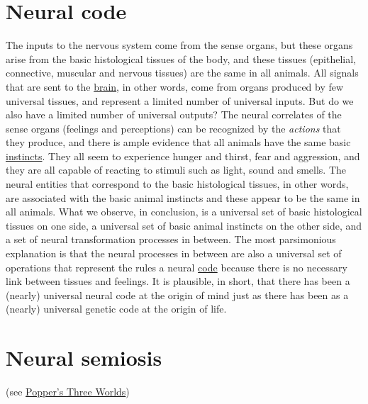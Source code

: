 \documentclass[12pt]{article}
\begin{document}
\section{Neural code}
The inputs to the nervous system come from the sense organs, but these organs arise from the basic histological tissues of the body, and these tissues (epithelial, connective, muscular and nervous tissues) are the same in all animals. All signals that are sent to the \hyperlink{brain}{brain}, in other words, come from organs produced by few universal tissues, and represent a limited number of universal inputs. But do we also have a limited number of universal outputs? The neural correlates of the sense organs (feelings and perceptions) can be recognized by the \textit{actions} that they produce, and there is ample evidence that all animals have the same basic \hyperlink{instinctive_brain}{instincts}. They all seem to experience hunger and thirst, fear and aggression, and they are all capable of reacting to stimuli such as light, sound and smells. The neural entities that correspond to the basic histological tissues, in other words, are associated with the basic animal instincts and these appear to be the same in all animals. What we observe, in conclusion, is a universal set of basic histological tissues on one side, a universal set of basic animal instincts on the other side, and a set of neural transformation processes in between. The most parsimonious explanation is that the neural processes in between are also a universal set of operations that represent the rules a neural \hyperlink{code}{code} because there is no necessary link between tissues and feelings. It is plausible, in short, that there has been a (nearly) universal neural code at the origin of mind just as there has been as a (nearly) universal genetic code at the origin of life. 


\hypertarget{neural_semiosis}{}
\section{Neural semiosis} (see \hyperlink{poppers_three_worlds}{Popper's Three Worlds})


\hypertarget{nominal_entities}{}
\end{document}
